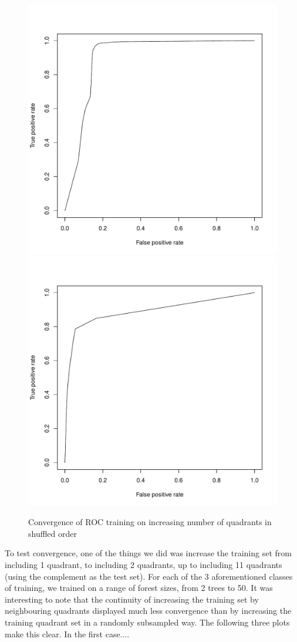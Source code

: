 \documentclass{article}\usepackage[]{graphicx}\usepackage[]{color}
\begin{document}
  \begin{figure}[H]
  \includegraphics[width=\linewidth, height = 150pts ]{ROC_image4.pdf}
\endminipage\hfill
{}
  \includegraphics[width=\linewidth, height = 150pts]{ROC_image8.pdf}
\endminipage\hfill
  \caption{Convergence of ROC training on increasing number of quadrants in shuffled order}\label{}
\end{figure}

 To test convergence, one of the things we did was increase the training set from including 1 quadrant, to including 2 quadrants, up to including 11 quadrants (using the complement as the test set).  For each of the 3 aforementioned classes of training, we trained on a range of forest sizes, from 2 trees to 50. It was interesting to note that the continuity of increasing the training set by neighbouring quadrants displayed much less convergence than by increasing the training quadrant set in a randomly subsampled way.  The following three plots make this clear.  In the first case....\\
\end{document}
